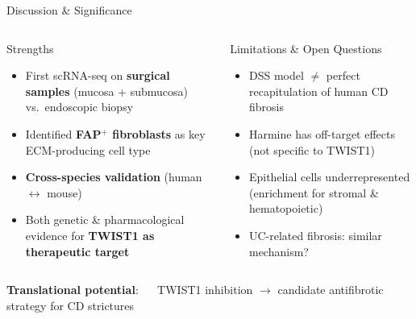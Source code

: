 \documentclass[aspectratio=169,10pt]{beamer}
\begin{document}
\begin{frame}{Discussion \& Significance}
\begin{columns}[T]
\begin{exampleblock}{Strengths}
\begin{itemize}
  \item First scRNA-seq on \textbf{surgical samples} (mucosa + submucosa) vs.\ endoscopic biopsy
  \item Identified \textbf{FAP$^+$ fibroblasts} as key ECM-producing cell type
  \item \textbf{Cross-species validation} (human $\leftrightarrow$ mouse)
  \item Both genetic \& pharmacological evidence for \textbf{TWIST1 as therapeutic target}
\end{itemize}
\end{exampleblock}

\begin{alertblock}{Limitations \& Open Questions}
\begin{itemize}
  \item DSS model $\neq$ perfect recapitulation of human CD fibrosis
  \item Harmine has off-target effects (not specific to TWIST1)
  \item Epithelial cells underrepresented (enrichment for stromal \& hematopoietic)
  \item UC-related fibrosis: similar mechanism?
\end{itemize}
\end{alertblock}
\end{columns}
\vspace{6pt}

\textbf{Translational potential}:
$\quad$ TWIST1 inhibition $\rightarrow$ candidate antifibrotic strategy for CD strictures
\end{frame}
\end{document}
